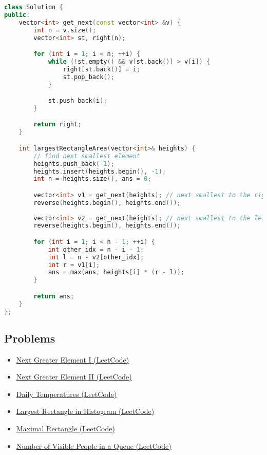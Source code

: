 \documentclass[12pt]{article}
\begin{document}
\begin{lstlisting}[language=C++]
class Solution {
public:
    vector<int> get_next(const vector<int> &v) {
        int n = v.size();
        vector<int> st, right(n);

        for (int i = 1; i < n; ++i) {
            while (!st.empty() && v[st.back()] > v[i]) {
                right[st.back()] = i;
                st.pop_back();
            }

            st.push_back(i);
        }

        return right;
    }

    int largestRectangleArea(vector<int>& heights) {
        // find next smallest element
        heights.push_back(-1);
        heights.insert(heights.begin(), -1);
        int n = heights.size(), ans = 0;

        vector<int> v1 = get_next(heights); // next smallest to the right
        reverse(heights.begin(), heights.end());
        
        vector<int> v2 = get_next(heights); // next smallest to the left
        reverse(heights.begin(), heights.end());

        for (int i = 1; i < n - 1; ++i) {
            int other_idx = n - i - 1;
            int l = n - v2[other_idx];
            int r = v1[i];
            ans = max(ans, heights[i] * (r - l));
        }

        return ans;
    }
};
\end{lstlisting}

\subsection{Problems}
\begin{itemize}
    \item \href{https://leetcode.com/problems/next-greater-element-i/}{Next Greater Element I (LeetCode)}
    \item \href{https://leetcode.com/problems/next-greater-element-ii/}{Next Greater Element II (LeetCode)}
    \item \href{https://leetcode.com/problems/daily-temperatures/}{Daily Temperatures (LeetCode)}
    \item \href{https://leetcode.com/problems/largest-rectangle-in-histogram/}{Largest Rectangle in Histogram (LeetCode)}
    \item \href{https://leetcode.com/problems/maximal-rectangle/}{Maximal Rectangle (LeetCode)}
    \item \href{https://leetcode.com/problems/number-of-visible-people-in-a-queue/description/?envType=company&envId=google&favoriteSlug=google-thirty-days} {Number of Visible People in a Queue (LeetCode)}
\end{itemize}
\end{document}
